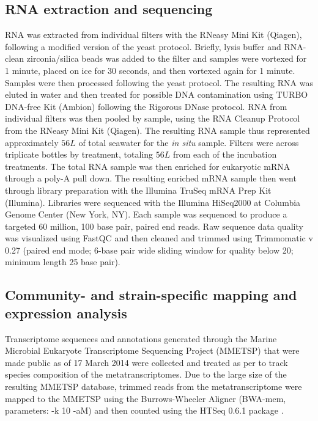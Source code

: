 \subsection{RNA extraction and sequencing}
RNA was extracted from individual filters with the RNeasy Mini Kit (Qiagen), following a modified version of the yeast protocol. Briefly, lysis buffer and RNA-clean zirconia/silica beads was added to the filter and samples were vortexed for 1 minute, placed on ice for 30 seconds, and then vortexed again for 1 minute. Samples were then processed following the yeast protocol. The resulting RNA was eluted in water and then treated for possible DNA contamination using TURBO DNA-free Kit (Ambion) following the Rigorous DNase protocol. RNA from individual filters was then pooled by sample, using the RNA Cleanup Protocol from the RNeasy Mini Kit (Qiagen). The resulting RNA sample thus represented approximately $56 L$ of total seawater for the \textit{in situ} sample. Filters were across triplicate bottles by treatment, totaling $56 L$ from each of the incubation treatments. The total RNA sample was then enriched for eukaryotic mRNA through a poly-A pull down. The resulting enriched mRNA sample then went through library preparation with the Illumina TruSeq mRNA Prep Kit (Illumina). Libraries were sequenced with the Illumina HiSeq2000 at Columbia Genome Center (New York, NY). Each sample was sequenced to produce a targeted 60 million, 100 base pair, paired end reads. Raw sequence data quality was visualized using FastQC and then cleaned and trimmed using Trimmomatic v 0.27 (paired end mode; 6-base pair wide sliding window for quality below 20; minimum length 25 base pair).

\subsection{Community- and strain-specific mapping and expression analysis}
Transcriptome sequences and annotations generated through the Marine Microbial Eukaryote Transcriptome Sequencing Project (MMETSP) \citep{Keeling2014} that were made public as of 17 March 2014 were collected and treated as per \citet{Alexander2015a} to track species composition of the metatranscriptomes. Due to the large size of the resulting MMETSP database, trimmed reads from the metatranscriptome were mapped to the MMETSP using the Burrows-Wheeler Aligner \citep{Li2010} (BWA-mem, parameters: -k 10 -aM) and then counted using the HTSeq 0.6.1 package \citep{Anders2014}. \par

